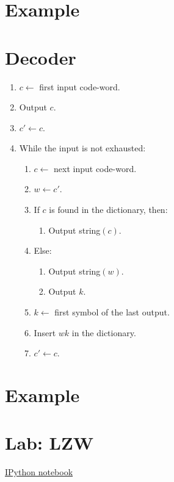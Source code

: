 \section{Example}

\section{Decoder}

\begin{enumerate}
\tightlist
\item
  \(c\leftarrow\) first input code-word.
\item
  Output \(c\).
\item
  \(c'\leftarrow c\).
\item
  While the input is not exhausted:
  \begin{enumerate}
  \tightlist
  \item
    \(c\leftarrow\) next input code-word.
  \item
    \(w\leftarrow c'\).
  \item
    If \(c\) is found in the dictionary, then:
    \begin{enumerate}
    \tightlist
    \item
      Output string\((c)\).
    \end{enumerate}
  \item
    Else:
    \begin{enumerate}
    \tightlist
    \item
      Output string\((w)\).
    \item
      Output \(k\).
    \end{enumerate}
  \item
    \(k\leftarrow\) first symbol of the last output.
  \item
    Insert \(wk\) in the dictionary.
  \item
    \(c'\leftarrow c\).
  \end{enumerate}
\end{enumerate}

\section{Example}

\section{Lab: LZW}
\href{https://nbviewer.jupyter.org/github/vicente-gonzalez-ruiz/LZW/blob/master/LZW.ipynb}{IPython notebook}


